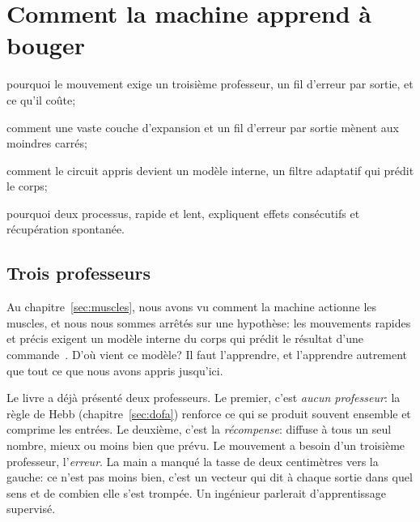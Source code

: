 \chapter{Comment la machine apprend à bouger}
\label{sec:motorlearning}
\begin{chaptergoals}
\item pourquoi le mouvement exige un troisième professeur, un fil d'erreur par sortie, et ce qu'il coûte;
\item comment une vaste couche d'expansion  et un fil d'erreur par sortie mènent aux moindres carrés;
\item comment le circuit appris devient un modèle interne, un filtre adaptatif qui prédit le corps;
\item pourquoi deux processus, rapide et lent, expliquent effets consécutifs et récupération spontanée.
\end{chaptergoals}

\section{Trois professeurs}

Au chapitre~\ref{sec:muscles}, nous avons vu comment la machine actionne les muscles, et nous nous sommes arrêtés sur une hypothèse: les mouvements rapides et précis exigent un modèle interne du corps qui prédit le résultat d'une commande~\cite{WolpertGhahramani2000}. D'où vient ce modèle? Il faut l'apprendre, et l'apprendre autrement que tout ce que nous avons appris jusqu'ici.

Le livre a déjà présenté deux professeurs. Le premier, c'est \emph{aucun professeur}: la règle de Hebb (chapitre~\ref{sec:dofa}) renforce ce qui se produit souvent ensemble et comprime les entrées. Le deuxième, c'est la \emph{récompense}:  diffuse à tous un seul nombre, \og mieux ou moins bien que prévu\fg{}. Le mouvement a besoin d'un troisième professeur, l'\emph{erreur}. La main a manqué la tasse de deux centimètres vers la gauche: ce n'est pas \og moins bien\fg{}, c'est un vecteur qui dit à chaque sortie dans quel sens et de combien elle s'est trompée. Un ingénieur parlerait d'apprentissage supervisé.

